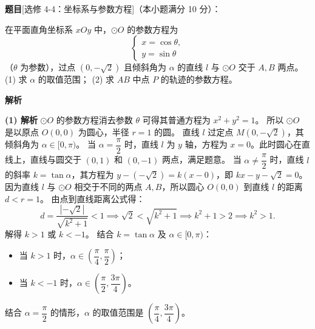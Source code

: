 \begin{answer}

\textbf{题目}[选修 4-4：坐标系与参数方程]（本小题满分 10 分）：

在平面直角坐标系 $xOy$ 中，$\odot O$ 的参数方程为
\nopagebreak[4]
\[
\begin{cases}
x = \cos\theta, \\
y = \sin\theta
\end{cases}
\]
（$\theta$ 为参数），过点 $(0, -\sqrt2)$ 且倾斜角为 $\alpha$ 的直线 $l$ 与 $\odot O$ 交于 $A, B$ 两点。
(1) 求 $\alpha$ 的取值范围；
(2) 求 $AB$ 中点 $P$ 的轨迹的参数方程。

\textbf{解析}

\textbf{(1) 解析} $\odot O$ 的参数方程消去参数 $\theta$ 可得其普通方程为 $x^2 + y^2 = 1$。
所以 $\odot O$ 是以原点 $O(0, 0)$ 为圆心，半径 $r = 1$ 的圆。
直线 $l$ 过定点 $M(0, -\sqrt2)$，其倾斜角为 $\alpha \in [0, \pi)$。
当 $\alpha = \dfrac\pi2$ 时，直线 $l$ 为 $y$ 轴，方程为 $x = 0$。此时圆心在直线上，直线与圆交于 $(0, 1)$ 和 $(0, -1)$ 两点，满足题意。
当 $\alpha \neq \dfrac\pi2$ 时，直线 $l$ 的斜率 $k = \tan\alpha$，其方程为 $y - (-\sqrt2) = k(x - 0)$，即 $kx - y - \sqrt2 = 0$。
因为直线 $l$ 与 $\odot O$ 相交于不同的两点 $A, B$，所以圆心 $O(0, 0)$ 到直线 $l$ 的距离 $d < r = 1$。
由点到直线距离公式得：
\nopagebreak[4]
\[d = \dfrac{|-\sqrt2|}{\sqrt{k^2 + 1}} < 1 \implies \sqrt2 < \sqrt{k^2 + 1} \implies k^2 + 1 > 2 \implies k^2 > 1.\]
解得 $k > 1$ 或 $k < -1$。
结合 $k = \tan\alpha$ 及 $\alpha \in [0, \pi)$：
\begin{itemize}
\item 当 $k > 1$ 时，$\alpha \in \left(\dfrac\pi4, \dfrac\pi2\right)$；
\item 当 $k < -1$ 时，$\alpha \in \left(\dfrac\pi2, \dfrac{3\pi}{4}\right)$。
\end{itemize}
结合 $\alpha = \dfrac\pi2$ 的情形，$\alpha$ 的取值范围是 $\left(\dfrac\pi4, \dfrac{3\pi}{4}\right)$。


\end{answer}
